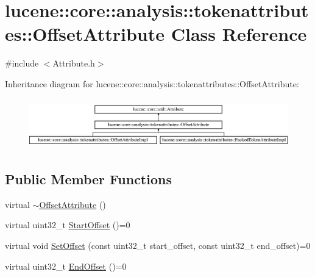 \hypertarget{classlucene_1_1core_1_1analysis_1_1tokenattributes_1_1OffsetAttribute}{}\section{lucene\+:\+:core\+:\+:analysis\+:\+:tokenattributes\+:\+:Offset\+Attribute Class Reference}
\label{classlucene_1_1core_1_1analysis_1_1tokenattributes_1_1OffsetAttribute}


{\ttfamily \#include $<$Attribute.\+h$>$}

Inheritance diagram for lucene\+:\+:core\+:\+:analysis\+:\+:tokenattributes\+:\+:Offset\+Attribute\+:\begin{figure}[H]
\begin{center}
\leavevmode
\includegraphics[height=2.210526cm]{classlucene_1_1core_1_1analysis_1_1tokenattributes_1_1OffsetAttribute}
\end{center}
\end{figure}
\subsection*{Public Member Functions}
\begin{DoxyCompactItemize}
\item 
virtual \mbox{\hyperlink{classlucene_1_1core_1_1analysis_1_1tokenattributes_1_1OffsetAttribute_aae91ff2e429a7f882d00b64a01b1f326}{$\sim$\+Offset\+Attribute}} ()
\item 
virtual uint32\+\_\+t \mbox{\hyperlink{classlucene_1_1core_1_1analysis_1_1tokenattributes_1_1OffsetAttribute_af841d190a7900a5b6a00f0a9f4ae7e43}{Start\+Offset}} ()=0
\item 
virtual void \mbox{\hyperlink{classlucene_1_1core_1_1analysis_1_1tokenattributes_1_1OffsetAttribute_aa0d076ac2e7c5af86668fbbeb8e26170}{Set\+Offset}} (const uint32\+\_\+t start\+\_\+offset, const uint32\+\_\+t end\+\_\+offset)=0
\item 
virtual uint32\+\_\+t \mbox{\hyperlink{classlucene_1_1core_1_1analysis_1_1tokenattributes_1_1OffsetAttribute_ada281ff6240e1a0fecf57707329ec974}{End\+Offset}} ()=0
\end{DoxyCompactItemize}
